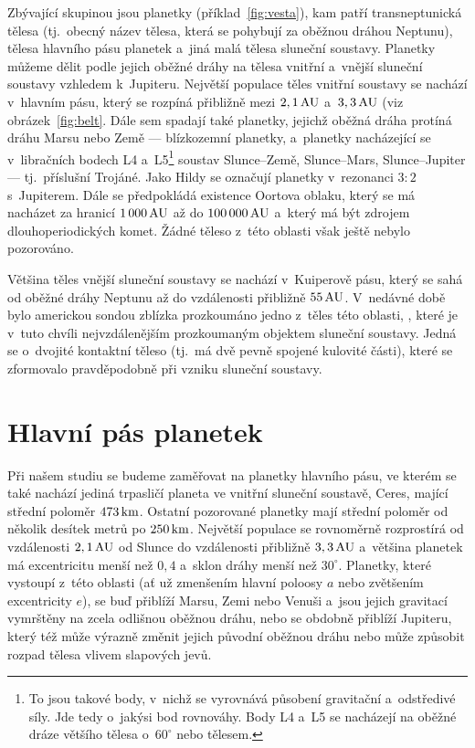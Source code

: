 \documentclass[A4paper, 12pt, oneside]{book}
\begin{document}
Zbývající skupinou jsou planetky (příklad~\ref{fig:vesta}), kam patří transneptunická tělesa (tj.\ obecný název tělesa, která se pohybují za oběžnou dráhou Neptunu), tělesa hlavního pásu planetek a~jiná malá tělesa sluneční soustavy. Planetky můžeme dělit podle jejich oběžné dráhy na tělesa vnitřní a~vnější sluneční soustavy vzhledem k~Jupiteru. Největší populace těles vnitřní soustavy se nachází v~hlavním pásu, který se rozpíná přibližně mezi $2,1\, {\rm AU}$ a~$3,3\, {\rm AU}$ (viz obrázek~\ref{fig:belt}. Dále sem spadají také planetky, jejichž oběžná dráha protíná dráhu Marsu nebo Země --- blízkozemní planetky, a~planetky nacházející se v~libračních bodech L4 a~L5\footnote{To jsou takové body, v~nichž se vyrovnává působení gravitační a~odstředivé síly. Jde tedy o~jakýsi bod rovnováhy. Body L4 a~L5 se nacházejí na oběžné dráze většího tělesa o~$60^\circ$  nebo  tělesem.} soustav Slunce--Země, Slunce--Mars, Slunce--Jupiter --- tj.\ příslušní Trojáné. Jako Hildy se označují planetky v~rezonanci $3:2$ s~Jupiterem. Dále se předpokládá existence Oortova oblaku, který se má nacházet za hranicí $1\,000\,{\rm AU}$ až do $100\,000\,{\rm AU}$ a~který má být zdrojem dlouhoperiodických komet. Žádné těleso z~této oblasti však ještě nebylo pozorováno.

Většina těles vnější sluneční soustavy se nachází v~Kuiperově pásu, který se sahá od oběžné dráhy Neptunu až do vzdálenosti přibližně $55\, {\rm AU}$. V~nedávné době bylo americkou sondou  zblízka prozkoumáno jedno z~těles této oblasti, , které je v~tuto chvíli nejvzdálenějším prozkoumaným objektem sluneční soustavy. Jedná se o~dvojité kontaktní těleso (tj.\ má dvě pevně spojené kulovité části), které se zformovalo pravděpodobně při vzniku sluneční soustavy.~\cite{ultimathule}

\pagebreak
\section{Hlavní pás planetek}
Při našem studiu se budeme zaměřovat na planetky hlavního pásu, ve kterém se také nachází jediná trpasličí planeta ve vnitřní sluneční soustavě, Ceres, mající střední poloměr $473\, {\rm km}$. Ostatní pozorované planetky mají střední poloměr od několik desítek metrů po $250\, {\rm km}$. Největší populace se rovnoměrně rozprostírá od vzdálenosti $2,1\, {\rm AU}$ od Slunce do vzdálenosti přibližně $3,3\, {\rm AU}$ a~většina planetek má excentricitu menší než $0,4$ a~sklon dráhy menší než $30^\circ$. Planetky, které vystoupí z~této oblasti (ať už zmenšením hlavní poloosy $a$ nebo zvětšením excentricity $e$), se buď přiblíží Marsu, Zemi nebo Venuši a~jsou jejich gravitací vymrštěny na zcela odlišnou oběžnou dráhu, nebo se obdobně přiblíží Jupiteru, který též může výrazně změnit jejich původní oběžnou dráhu nebo může způsobit rozpad tělesa vlivem slapových jevů.
\end{document}
